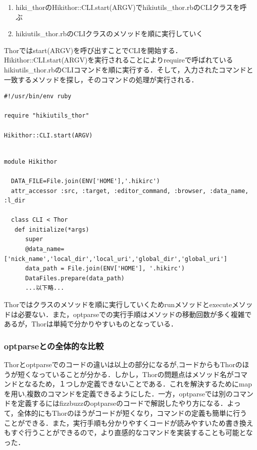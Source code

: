 \begin{enumerate}
\item hiki\_thorのHikithor::CLI.start(ARGV)でhikiutils\_thor.rbのCLIクラスを呼ぶ
\item hikiutils\_thor.rbのCLIクラスのメソッドを順に実行していく
\end{enumerate}
Thorではstart(ARGV)を呼び出すことでCLIを開始する．Hikithor::CLI.start(ARGV)を実行されることによりrequireで呼ばれているhikiutils\_thor.rbのCLIコマンドを順に実行する．そして，入力されたコマンドと一致するメソッドを探し，そのコマンドの処理が実行される．
\begin{lstlisting}[style=customRuby,basicstyle={\scriptsize\ttfamily}]
#!/usr/bin/env ruby                                                             

require "hikiutils_thor"

Hikithor::CLI.start(ARGV)
\end{lstlisting}\begin{lstlisting}[style=customRuby,basicstyle={\scriptsize\ttfamily}]

module Hikithor

  DATA_FILE=File.join(ENV['HOME'],'.hikirc')
  attr_accessor :src, :target, :editor_command, :browser, :data_name, :l_dir

  class CLI < Thor
   def initialize(*args)
      super
      @data_name=['nick_name','local_dir','local_uri','global_dir','global_uri']
      data_path = File.join(ENV['HOME'], '.hikirc')
      DataFiles.prepare(data_path)
      ...以下略...
\end{lstlisting}
Thorではクラスのメソッドを順に実行していくためrunメソッドとexecuteメソッドは必要ない．また，optparseでの実行手順はメソッドの移動回数が多く複雑であるが，Thorは単純で分かりやすいものとなっている．

\subsubsection{optparseとの全体的な比較}
Thorとoptparseでのコードの違いは以上の部分になるが,コードからもThorのほうが短くなっていることが分かる．しかし，Thorの問題点はメソッド名がコマンドとなるため，１つしか定義できないことである．これを解決するためにmapを用い,複数のコマンドを定義できるようにした．一方，optparseでは別のコマンドを定義するにはfizzbuzzのoptparseのコードで解説したやり方になる．よって，全体的にもThorのほうがコードが短くなり，コマンドの定義も簡単に行うことができる．また，実行手順も分かりやすくコードが読みやすいため書き換えもすぐ行うことができるので，より直感的なコマンドを実装することも可能となった．

